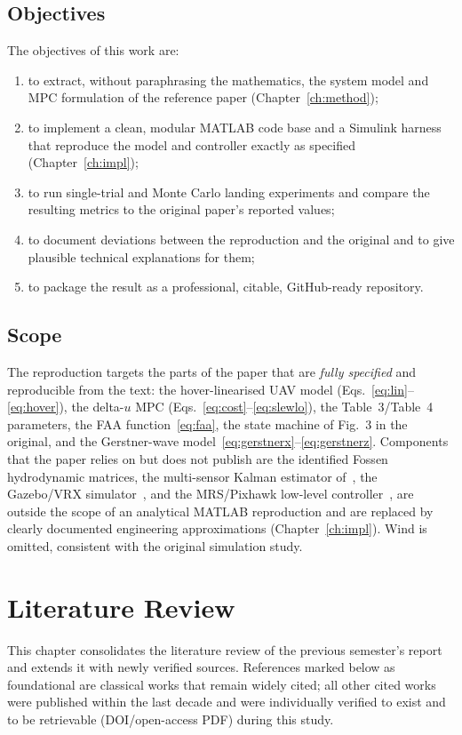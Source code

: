 \documentclass[12pt,a4paper]{report}
\begin{document}
\section{Objectives}
The objectives of this work are:
\begin{enumerate}[itemsep=2pt]
    \item to extract, without paraphrasing the mathematics, the system model and MPC formulation of the reference paper (Chapter~\ref{ch:method});
    \item to implement a clean, modular MATLAB code base and a Simulink harness that reproduce the model and controller exactly as specified (Chapter~\ref{ch:impl});
    \item to run single-trial and Monte Carlo landing experiments and compare the resulting metrics to the original paper's reported values;
    \item to document deviations between the reproduction and the original and to give plausible technical explanations for them;
    \item to package the result as a professional, citable, GitHub-ready repository.
\end{enumerate}

\section{Scope}
The reproduction targets the parts of the paper that are \emph{fully specified} and reproducible from the text: the hover-linearised UAV model (Eqs.~\eqref{eq:lin}--\eqref{eq:hover}), the delta-$u$ MPC (Eqs.~\eqref{eq:cost}--\eqref{eq:slewlo}), the Table~3/Table~4 parameters, the FAA function~\eqref{eq:faa}, the state machine of Fig.~3 in the original, and the Gerstner-wave model~\eqref{eq:gerstnerx}--\eqref{eq:gerstnerz}. Components that the paper relies on but does not publish are the identified Fossen hydrodynamic matrices, the multi-sensor Kalman estimator of~\cite{novak2025}, the Gazebo/VRX simulator~\cite{bingham2019}, and the MRS/Pixhawk low-level controller~\cite{baca2021}, are outside the scope of an analytical MATLAB reproduction and are replaced by clearly documented engineering approximations (Chapter~\ref{ch:impl}). Wind is omitted, consistent with the original simulation study.

\chapter{Literature Review}\label{ch:litreview}
This chapter consolidates the literature review of the previous semester's report and extends it with newly verified sources. References marked below as foundational are classical works that remain widely cited; all other cited works were published within the last decade and were individually verified to exist and to be retrievable (DOI/open-access PDF) during this study.
\end{document}
